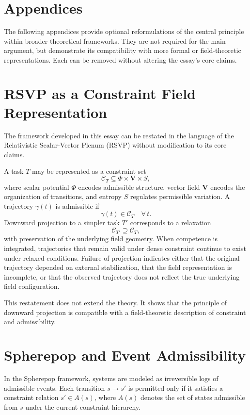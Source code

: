 \documentclass[12pt, a4paper]{article}
\begin{document}
\appendix

\section*{Appendices}

The following appendices provide optional reformulations of the central principle within broader theoretical frameworks. They are not required for the main argument, but demonstrate its compatibility with more formal or field-theoretic representations. Each can be removed without altering the essay's core claims.

\section{RSVP as a Constraint Field Representation}

The framework developed in this essay can be restated in the language of the Relativistic Scalar-Vector Plenum (RSVP) without modification to its core claims.

A task $T$ may be represented as a constraint set
\[
\mathcal{C}_T \subseteq \Phi \times \mathbf{V} \times S,
\]
where scalar potential $\Phi$ encodes admissible structure, vector field $\mathbf{V}$ encodes the organization of transitions, and entropy $S$ regulates permissible variation. A trajectory $\gamma(t)$ is admissible if
\[
\gamma(t) \in \mathcal{C}_T \quad \forall\, t.
\]
Downward projection to a simpler task $T'$ corresponds to a relaxation
\[
\mathcal{C}_{T'} \supseteq \mathcal{C}_T,
\]
with preservation of the underlying field geometry. When competence is integrated, trajectories that remain valid under dense constraint continue to exist under relaxed conditions. Failure of projection indicates either that the original trajectory depended on external stabilization, that the field representation is incomplete, or that the observed trajectory does not reflect the true underlying field configuration.

This restatement does not extend the theory. It shows that the principle of downward projection is compatible with a field-theoretic description of constraint and admissibility.

\section{Spherepop and Event Admissibility}

In the Spherepop framework, systems are modeled as irreversible logs of admissible events. Each transition $s \to s'$ is permitted only if it satisfies a constraint relation $s' \in A(s)$, where $A(s)$ denotes the set of states admissible from $s$ under the current constraint hierarchy.
\end{document}
